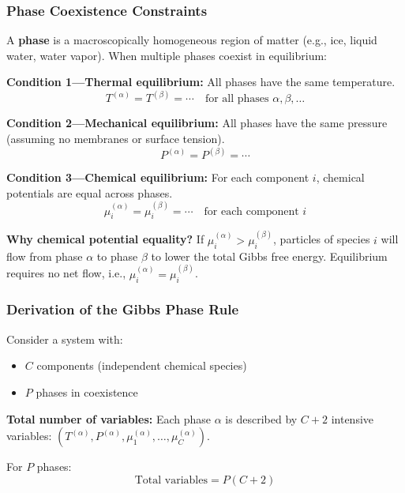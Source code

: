 \documentclass[9pt,twocoloumn]{article}
\begin{document}
\subsubsection{Phase Coexistence Constraints}

A \textbf{phase} is a macroscopically homogeneous region of matter (e.g., ice, liquid water, water vapor). When multiple phases coexist in equilibrium:

\textbf{Condition 1—Thermal equilibrium:} All phases have the same temperature.
\begin{equation}
T^{(\alpha)} = T^{(\beta)} = \cdots \quad \text{for all phases } \alpha, \beta, \ldots
\end{equation}

\textbf{Condition 2—Mechanical equilibrium:} All phases have the same pressure (assuming no membranes or surface tension).
\begin{equation}
P^{(\alpha)} = P^{(\beta)} = \cdots
\end{equation}

\textbf{Condition 3—Chemical equilibrium:} For each component $i$, chemical potentials are equal across phases.
\begin{equation}
\mu_i^{(\alpha)} = \mu_i^{(\beta)} = \cdots \quad \text{for each component } i
\end{equation}

\textbf{Why chemical potential equality?} If $\mu_i^{(\alpha)} > \mu_i^{(\beta)}$, particles of species $i$ will flow from phase $\alpha$ to phase $\beta$ to lower the total Gibbs free energy. Equilibrium requires no net flow, i.e., $\mu_i^{(\alpha)} = \mu_i^{(\beta)}$.

\subsubsection{Derivation of the Gibbs Phase Rule}

Consider a system with:
\begin{itemize}
    \item $C$ components (independent chemical species)
    \item $P$ phases in coexistence
\end{itemize}

\textbf{Total number of variables:} Each phase $\alpha$ is described by $C+2$ intensive variables: $(T^{(\alpha)}, P^{(\alpha)}, \mu_1^{(\alpha)}, \ldots, \mu_C^{(\alpha)})$.

For $P$ phases:
\begin{equation}
\text{Total variables} = P(C + 2)
\end{equation}
\end{document}
